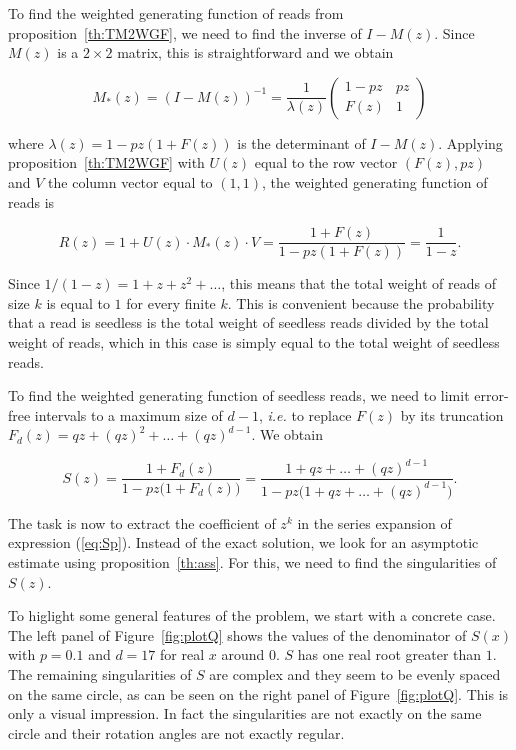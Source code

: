 \documentclass{article}
\begin{document}
To find the weighted generating function of reads from
proposition~\ref{th:TM2WGF}, we need to find the inverse of $I-M(z)$.
Since $M(z)$ is a $2 \times 2$ matrix, this is straightforward and we
obtain

\begin{equation*}
M_*(z) = (I-M(z))^{-1}=
\frac{1}{\lambda(z)}
\left(
\begin{matrix}
1-pz & pz   \\
F(z) & 1
\end{matrix}
\right)
\end{equation*}

\noindent
where $\lambda(z) = 1-pz(1+F(z))$ is the determinant of $I-M(z)$. Applying
proposition~\ref{th:TM2WGF} with $U(z)$ equal to the row vector $(F(z),
pz)$ and $V$ the column vector equal to $(1,1)$, the weighted generating
function of reads is

\begin{equation}
\label{eq:Ssub}
R(z) = 1 + U(z) \cdot M_*(z) \cdot V = 
\frac{1+F(z)}{1-pz(1+F(z))} = \frac{1}{1-z}.
\end{equation}

Since $1/(1-z) = 1+z+z^2 + \ldots$, this means that the total weight of
reads of size $k$ is equal to $1$ for every finite $k$. This is convenient
because the probability that a read is seedless is the total weight of
seedless reads divided by the total weight of reads, which in this case is
simply equal to the total weight of seedless reads.

To find the weighted generating function of seedless reads, we need to
limit error-free intervals to a maximum size of $d-1$, \textit{i.e.} to
replace $F(z)$ by its truncation $F_d(z) = qz + (qz)^2 + \ldots
+ (qz)^{d-1}$. We obtain

\begin{equation}
\label{eq:Sp}
S(z) = \frac{1+F_d(z)}{1-pz\big( 1+F_d(z) \big)} =
\frac{1+qz + \ldots + (qz)^{d-1}}{1-pz \big(1+qz + \ldots +
(qz)^{d-1} \big)}.
\end{equation}

The task is now to extract the coefficient of $z^k$ in the series
expansion of expression (\ref{eq:Sp}). Instead of the exact solution, we
look for an asymptotic estimate using proposition~\ref{th:ass}. For this,
we need to find the singularities of $S(z)$.

To higlight some general features of the problem, we start with a concrete
case. The left panel of Figure~\ref{fig:plotQ} shows the values of the
denominator of $S(x)$ with $p=0.1$ and $d=17$ for real $x$ around $0$. $S$
has one real root greater than $1$.  The remaining singularities of $S$
are complex and they seem to be evenly spaced on the same circle, as can
be seen on the right panel of Figure~\ref{fig:plotQ}.  This is only a
visual impression.  In fact the singularities are not exactly on the same
circle and their rotation angles are not exactly regular.
\end{document}
